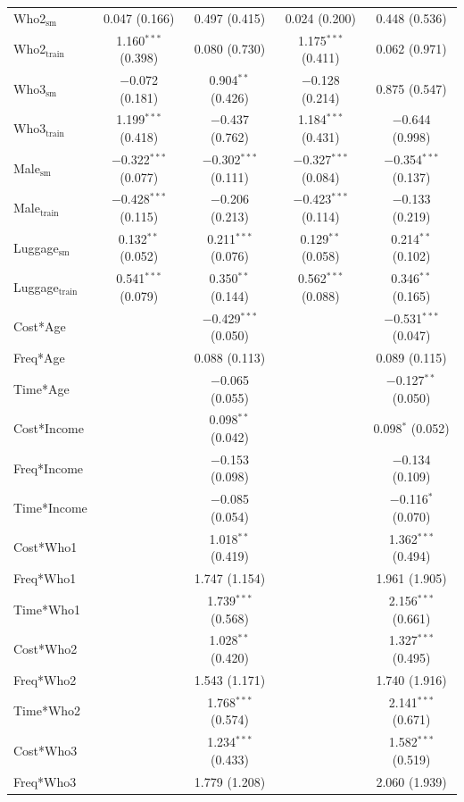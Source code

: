 \documentclass[a4paper, 12pt]{article}
\begin{document}
\begin{appendix}
\begin{table}[!htbp]
{\begin{tabular}{@{\extracolsep{5pt}}lcccc}
  Who2$_\text{sm}$ & 0.047 (0.166) & 0.497 (0.415) & 0.024 (0.200) & 0.448 (0.536) \\ 
  Who2$_\text{train}$ & 1.160$^{***}$ (0.398) & 0.080 (0.730) & 1.175$^{***}$ (0.411) & 0.062 (0.971) \\ 
  Who3$_\text{sm}$ & $-$0.072 (0.181) & 0.904$^{**}$ (0.426) & $-$0.128 (0.214) & 0.875 (0.547) \\ 
  Who3$_\text{train}$ & 1.199$^{***}$ (0.418) & $-$0.437 (0.762) & 1.184$^{***}$ (0.431) & $-$0.644 (0.998) \\ 
  Male$_\text{sm}$ & $-$0.322$^{***}$ (0.077) & $-$0.302$^{***}$ (0.111) & $-$0.327$^{***}$ (0.084) & $-$0.354$^{***}$ (0.137) \\ 
  Male$_\text{train}$ & $-$0.428$^{***}$ (0.115) & $-$0.206 (0.213) & $-$0.423$^{***}$ (0.114) & $-$0.133 (0.219) \\ 
  Luggage$_\text{sm}$ & 0.132$^{**}$ (0.052) & 0.211$^{***}$ (0.076) & 0.129$^{**}$ (0.058) & 0.214$^{**}$ (0.102) \\ 
  Luggage$_\text{train}$ & 0.541$^{***}$ (0.079) & 0.350$^{**}$ (0.144) & 0.562$^{***}$ (0.088) & 0.346$^{**}$ (0.165) \\ 
  Cost*Age &  & $-$0.429$^{***}$ (0.050) &  & $-$0.531$^{***}$ (0.047) \\ 
  Freq*Age &  & 0.088 (0.113) &  & 0.089 (0.115) \\ 
  Time*Age &  & $-$0.065 (0.055) &  & $-$0.127$^{**}$ (0.050) \\ 
  Cost*Income &  & 0.098$^{**}$ (0.042) &  & 0.098$^{*}$ (0.052) \\ 
  Freq*Income &  & $-$0.153 (0.098) &  & $-$0.134 (0.109) \\ 
  Time*Income &  & $-$0.085 (0.054) &  & $-$0.116$^{*}$ (0.070) \\ 
  Cost*Who1 &  & 1.018$^{**}$ (0.419) &  & 1.362$^{***}$ (0.494) \\ 
  Freq*Who1 &  & 1.747 (1.154) &  & 1.961 (1.905) \\ 
  Time*Who1 &  & 1.739$^{***}$ (0.568) &  & 2.156$^{***}$ (0.661) \\ 
  Cost*Who2 &  & 1.028$^{**}$ (0.420) &  & 1.327$^{***}$ (0.495) \\ 
  Freq*Who2 &  & 1.543 (1.171) &  & 1.740 (1.916) \\ 
  Time*Who2 &  & 1.768$^{***}$ (0.574) &  & 2.141$^{***}$ (0.671) \\ 
  Cost*Who3 &  & 1.234$^{***}$ (0.433) &  & 1.582$^{***}$ (0.519) \\ 
  Freq*Who3 &  & 1.779 (1.208) &  & 2.060 (1.939) \\ 

\end{tabular}}
\end{table}
\end{appendix}
\end{document}
